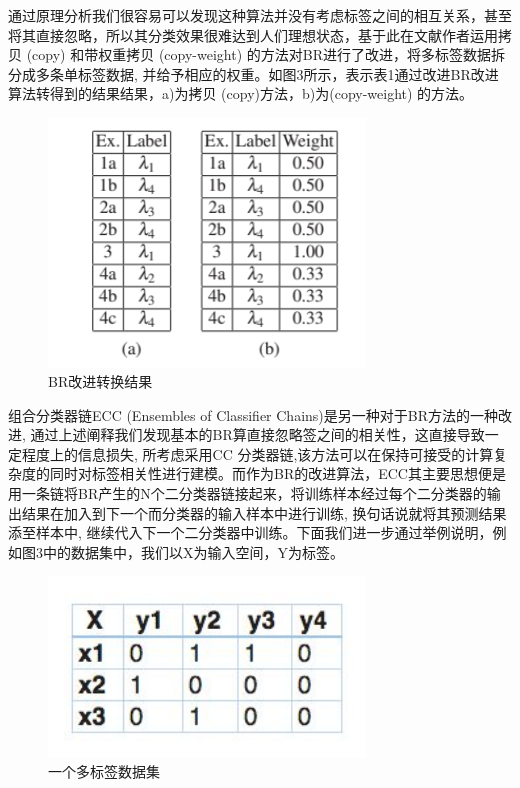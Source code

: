 通过原理分析我们很容易可以发现这种算法并没有考虑标签之间的相互关系，甚至将其直接忽略，所以其分类效果很难达到人们理想状态，基于此在文献\cite{Clare2002Knowledge}作者运用拷贝 (copy) 和带权重拷贝 (copy-weight) 的方法对BR进行了改进，将多标签数据拆分成多条单标签数据, 并给予相应的权重。如图3所示，表示表1通过改进BR改进算法转得到的结果结果，a)为拷贝 (copy)方法，b)为(copy-weight) 的方法。

\begin{figure}[htbp!]
	\centering
	\includegraphics[width=0.75\textwidth]{figures/p2-3.png}
	\caption{BR改进转换结果}\label{fig:p2-3}
	\vspace{-1em}
\end{figure}

组合分类器链ECC (Ensembles of Classifier Chains)是另一种对于BR方法的一种改进, 通过上述阐释我们发现基本的BR算直接忽略签之间的相关性，这直接导致一定程度上的信息损失, 所考虑采用CC 分类器链,该方法可以在保持可接受的计算复杂度的同时对标签相关性进行建模。而作为BR的改进算法，ECC其主要思想便是用一条链将BR产生的N个二分类器链接起来，将训练样本经过每个二分类器的输出结果在加入到下一个而分类器的输入样本中进行训练, 换句话说就将其预测结果添至样本中, 继续代入下一个二分类器中训练。下面我们进一步通过举例说明，例如图3中的数据集中，我们以X为输入空间，Y为标签。

\begin{figure}[htbp!]
	\centering
	\includegraphics[width=0.75\textwidth]{figures/p2-4.png}
	\caption{一个多标签数据集}\label{fig:p2-4}
	\vspace{-1em}
\end{figure}

